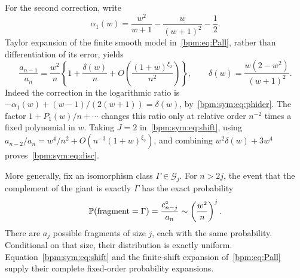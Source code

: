 \documentclass[11pt,a4paper]{article}
\theoremstyle{remark}\newtheorem{remark}[theorem]{Remark}%
\begin{document}
For the second correction, write
\[
 \alpha_1(w)=\frac{w^2}{w+1}-\frac{w}{(w+1)^2}-\frac12.
\]
Taylor expansion of the finite smooth model in~\eqref{bpm:eq:Pall}, rather than differentiation of its error, yields
\begin{equation}\label{bpm:sym:eq:ratio2}
 \frac{a_{n-1}}{a_n}=\frac{w^2}{n}
 \left\{1+\frac{\delta(w)}n+O\!\left(\frac{(1+w)^{\xi_2}}{n^2}\right)\right\},
 \qquad \delta(w)=\frac{w(2-w^2)}{(w+1)^2}.
\end{equation}
Indeed the correction in the logarithmic ratio is
$-\alpha_1(w)+(w-1)/(2(w+1))=\delta(w)$, by~\eqref{bpm:sym:eq:phider}. The factor $1+P_1(w)/n+\cdots$ changes this ratio only at relative order $n^{-2}$ times a fixed polynomial in $w$. Taking $J=2$ in~\eqref{bpm:sym:eq:shift}, using $a_{n-2}/a_n=w^4/n^2+O(n^{-3}(1+w)^{\xi_3})$, and combining $w^2\delta(w)+3w^4$ proves~\eqref{bpm:sym:eq:disc}.

More generally, fix an isomorphism class $\Gamma\in\mathcal G_j$. For $n>2j$, the event that the complement of the giant is exactly $\Gamma$ has the exact probability
\begin{equation}\label{bpm:sym:eq:fragment}
 \mathbb P(\text{fragment}=\Gamma)=\frac{c^\circ_{n-j}}{a_n}
 \sim\left(\frac{w^2}{n}\right)^j.
\end{equation}
There are $a_j$ possible fragments of size $j$, each with the same probability. Conditional on that size, their distribution is exactly uniform. Equation~\eqref{bpm:sym:eq:shift} and the finite-shift expansion of~\eqref{bpm:eq:Pall} supply their complete fixed-order probability expansions.
\end{document}
